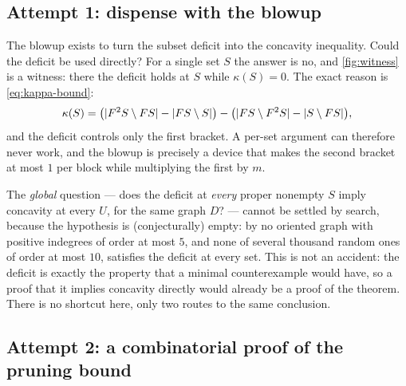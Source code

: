 \subsection*{Attempt 1: dispense with the blowup}

The blowup exists to turn the subset deficit into the concavity inequality. Could the deficit be used
directly? For a single set $S$ the answer is no, and \cref{fig:witness} is a witness: there the
deficit holds at $S$ while $\kappa(S)=0$. The exact reason is \eqref{eq:kappa-bound}:
\[
 \kappa(S)=\bigl(\lvert F^2S\setminus FS\rvert-\lvert FS\setminus S\rvert\bigr)
 -\bigl(\lvert FS\setminus F^2S\rvert-\lvert S\setminus FS\rvert\bigr),
\]
and the deficit controls only the first bracket. A per-set argument can therefore never work, and the
blowup is precisely a device that makes the second bracket at most $1$ per block while multiplying
the first by $m$.

The \emph{global} question --- does the deficit at \emph{every} proper nonempty $S$ imply concavity at
every $U$, for the same graph $D$? --- cannot be settled by search, because the hypothesis is
(conjecturally) empty: by  no oriented graph with positive indegrees of order at most
$5$, and none of several thousand random ones of order at most $10$, satisfies the deficit at every
set. This is not an accident: the deficit is exactly the property that a minimal counterexample would
have, so a proof that it implies concavity directly would already be a proof of the theorem. There is
no shortcut here, only two routes to the same conclusion.

\subsection*{Attempt 2: a combinatorial proof of the pruning bound}


